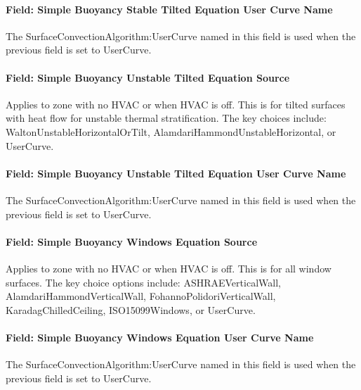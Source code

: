 \paragraph{Field: Simple Buoyancy Stable Tilted Equation User Curve Name}\label{field-simple-buoyancy-stable-tilted-equation-user-curve-name}

The SurfaceConvectionAlgorithm:UserCurve named in this field is used when the previous field is set to UserCurve.

\paragraph{Field: Simple Buoyancy Unstable Tilted Equation Source}\label{field-simple-buoyancy-unstable-tilted-equation-source}

Applies to zone with no HVAC or when HVAC is off. This is for tilted surfaces with heat flow for unstable thermal stratification. The key choices include: WaltonUnstableHorizontalOrTilt, AlamdariHammondUnstableHorizontal, or UserCurve.

\paragraph{Field: Simple Buoyancy Unstable Tilted Equation User Curve Name}\label{field-simple-buoyancy-unstable-tilted-equation-user-curve-name}

The SurfaceConvectionAlgorithm:UserCurve named in this field is used when the previous field is set to UserCurve.

\paragraph{Field: Simple Buoyancy Windows Equation Source}\label{field-simple-buoyancy-windows-equation-source}

Applies to zone with no HVAC or when HVAC is off. This is for all window surfaces. The key choice options include: ASHRAEVerticalWall, AlamdariHammondVerticalWall, FohannoPolidoriVerticalWall, KaradagChilledCeiling, ISO15099Windows, or UserCurve.

\paragraph{Field: Simple Buoyancy Windows Equation User Curve Name}\label{field-simple-buoyancy-windows-equation-user-curve-name}

The SurfaceConvectionAlgorithm:UserCurve named in this field is used when the previous field is set to UserCurve.


